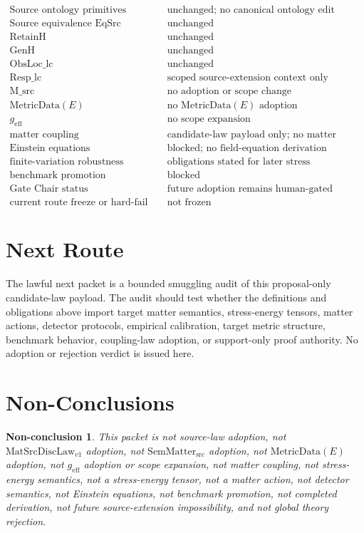 \documentclass[11pt]{article}
\newtheorem{nonconclusion}{Non-conclusion}
\newcommand{\MatSrcDiscLaw}{\mathrm{MatSrcDiscLaw}_{v1}}
\newcommand{\SemMatterSrc}{\mathrm{SemMatter}_{\mathrm{src}}}
\newcommand{\MetricData}{\mathrm{MetricData}}
\newcommand{\geff}{g_{\mathrm{eff}}}
\begin{document}
\[
\begin{array}{ll}
\text{Source ontology primitives} & \text{unchanged; no canonical ontology edit}\\
\text{Source equivalence EqSrc} & \text{unchanged}\\
\text{RetainH} & \text{unchanged}\\
\text{GenH} & \text{unchanged}\\
\text{ObsLoc\_lc} & \text{unchanged}\\
\text{Resp\_lc} & \text{scoped source-extension context only}\\
\text{M\_src} & \text{no adoption or scope change}\\
\text{\(\MetricData(E)\)} & \text{no \(\MetricData(E)\) adoption}\\
\text{\(\geff\)} & \text{no scope expansion}\\
\text{matter coupling} & \text{candidate-law payload only; no matter coupling}\\
\text{Einstein equations} & \text{blocked; no field-equation derivation}\\
\text{finite-variation robustness} & \text{obligations stated for later stress}\\
\text{benchmark promotion} & \text{blocked}\\
\text{Gate Chair status} & \text{future adoption remains human-gated}\\
\text{current route freeze or hard-fail status} & \text{not frozen}
\end{array}
\]

\section{Next Route}

The lawful next packet is a bounded smuggling audit of this proposal-only
candidate-law payload.  The audit should test whether the definitions and
obligations above import target matter semantics, stress-energy tensors,
matter actions, detector protocols, empirical calibration, target metric
structure, benchmark behavior, coupling-law adoption, or support-only proof
authority.  No adoption or rejection verdict is issued here.

\section{Non-Conclusions}

\begin{nonconclusion}
This packet is not source-law adoption, not \(\MatSrcDiscLaw\) adoption, not
\(\SemMatterSrc\) adoption, not \(\MetricData(E)\) adoption, not \(\geff\)
adoption or scope expansion, not matter coupling, not stress-energy semantics,
not a stress-energy tensor, not a matter action, not detector semantics, not
Einstein equations, not benchmark promotion, not completed derivation, not
future source-extension impossibility, and not global theory rejection.
\end{nonconclusion}
\end{document}
